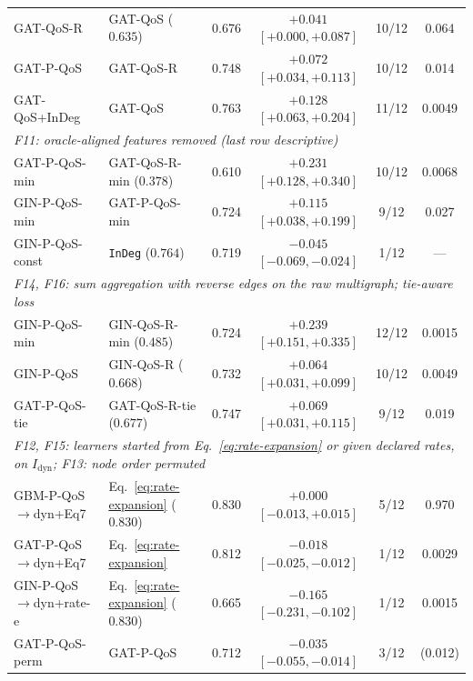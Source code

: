 \documentclass[preprint,3p]{elsarticle}
\begin{document}
\begin{table}[htbp]
{\begin{tabular}{llcccc}
GAT-QoS-R & GAT-QoS ($0.635$) & 0.676 & $+0.041$ $[+0.000, +0.087]$ & 10/12 & 0.064 \\
GAT-P-QoS & GAT-QoS-R & 0.748 & $+0.072$ $[+0.034, +0.113]$ & 10/12 & 0.014 \\
GAT-QoS+InDeg & GAT-QoS & 0.763 & $+0.128$ $[+0.063, +0.204]$ & 11/12 & 0.0049 \\
\midrule
\multicolumn{6}{l}{\textit{F11: oracle-aligned features removed (last row descriptive)}} \\
GAT-P-QoS-min & GAT-QoS-R-min ($0.378$) & 0.610 & $+0.231$ $[+0.128, +0.340]$ & 10/12 & 0.0068 \\
GIN-P-QoS-min & GAT-P-QoS-min & 0.724 & $+0.115$ $[+0.038, +0.199]$ & 9/12 & 0.027 \\
GIN-P-QoS-const & \texttt{InDeg} ($0.764$) & 0.719 & $-0.045$ $[-0.069, -0.024]$ & 1/12 & --- \\
\midrule
\multicolumn{6}{l}{\textit{F14, F16: sum aggregation with reverse edges on the raw multigraph; tie-aware loss}} \\
GIN-P-QoS-min & GIN-QoS-R-min ($0.485$) & 0.724 & $+0.239$ $[+0.151, +0.335]$ & 12/12 & 0.0015 \\
GIN-P-QoS & GIN-QoS-R ($0.668$) & 0.732 & $+0.064$ $[+0.031, +0.099]$ & 10/12 & 0.0049 \\
GAT-P-QoS-tie & GAT-QoS-R-tie ($0.677$) & 0.747 & $+0.069$ $[+0.031, +0.115]$ & 9/12 & 0.019 \\
\midrule
\multicolumn{6}{l}{\textit{F12, F15: learners started from Eq.~\eqref{eq:rate-expansion} or given declared rates, on $I_{\text{dyn}}$; F13: node order permuted}} \\
GBM-P-QoS$\to$dyn+Eq7 & Eq.~\eqref{eq:rate-expansion} ($0.830$) & 0.830 & $+0.000$ $[-0.013, +0.015]$ & 5/12 & 0.970 \\
GAT-P-QoS$\to$dyn+Eq7 & Eq.~\eqref{eq:rate-expansion} & 0.812 & $-0.018$ $[-0.025, -0.012]$ & 1/12 & 0.0029 \\
GIN-P-QoS$\to$dyn+rate-e & Eq.~\eqref{eq:rate-expansion} ($0.830$) & 0.665 & $-0.165$ $[-0.231, -0.102]$ & 1/12 & 0.0015 \\
GAT-P-QoS-perm & GAT-P-QoS & 0.712 & $-0.035$ $[-0.055, -0.014]$ & 3/12 & (0.012) \\
\bottomrule
\end{tabular}%
}
\end{table}
\end{document}
